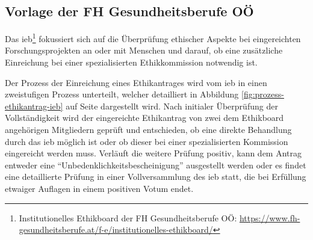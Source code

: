 \documentclass[a4paper,12pt,twoside]{scrreprt}
\begin{document}
\subsection{Vorlage der FH Gesundheitsberufe OÖ}
\label{sub-cec:vorlage-fh-oö}

Das \ac{ieb}\footnote{Institutionelles Ethikboard der FH Gesundheitsberufe OÖ: \url{https://www.fh-gesundheitsberufe.at/f-e/institutionelles-ethikboard/}} fokussiert sich auf die Überprüfung ethischer Aspekte bei eingereichten Forschungsprojekten an oder mit Menschen und darauf, ob eine zusätzliche Einreichung bei einer spezialisierten Ethikkommission notwendig ist. \cite{fh_gesundheitsberufe_oo_gmbh_institutionelles_2023}

\medskip

Der Prozess der Einreichung eines Ethikantrages wird vom \ac{ieb} in einen zweistufigen Prozess unterteilt, welcher detailliert in Abbildung \ref{fig:prozess-ethikantrag-ieb} auf Seite \pageref{fig:prozess-ethikantrag-ieb} dargestellt wird. Nach initialer Überprüfung der Vollständigkeit wird der eingereichte Ethikantrag von zwei dem Ethikboard angehörigen Mitgliedern geprüft und entschieden, ob eine direkte Behandlung durch das \ac{ieb} möglich ist oder ob dieser bei einer spezialisierten Kommission eingereicht werden muss. Verläuft die weitere Prüfung positiv, kann dem Antrag entweder eine \enquote{Unbedenklichkeitsbescheinigung} ausgestellt werden oder es findet eine detaillierte Prüfung in einer Vollversammlung des \ac{ieb} statt, die bei Erfüllung etwaiger Auflagen in einem positiven Votum endet. \cite{fh_gesundheitsberufe_oo_gmbh_einreichung_2023}
\end{document}

